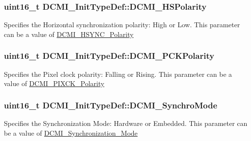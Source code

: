 \subsubsection[{D\+C\+M\+I\+\_\+\+H\+S\+Polarity}]{\setlength{\rightskip}{0pt plus 5cm}uint16\+\_\+t D\+C\+M\+I\+\_\+\+Init\+Type\+Def\+::\+D\+C\+M\+I\+\_\+\+H\+S\+Polarity}\label{struct_d_c_m_i___init_type_def_ab9f87fbe99bdd7f38700379896175512}
Specifies the Horizontal synchronization polarity\+: High or Low. This parameter can be a value of \hyperlink{group___d_c_m_i___h_s_y_n_c___polarity}{D\+C\+M\+I\+\_\+\+H\+S\+Y\+N\+C\+\_\+\+Polarity} \hypertarget{struct_d_c_m_i___init_type_def_a2768de44e7fa6fc7d9caf816cc5121c8}{}
\subsubsection[{D\+C\+M\+I\+\_\+\+P\+C\+K\+Polarity}]{\setlength{\rightskip}{0pt plus 5cm}uint16\+\_\+t D\+C\+M\+I\+\_\+\+Init\+Type\+Def\+::\+D\+C\+M\+I\+\_\+\+P\+C\+K\+Polarity}\label{struct_d_c_m_i___init_type_def_a2768de44e7fa6fc7d9caf816cc5121c8}
Specifies the Pixel clock polarity\+: Falling or Rising. This parameter can be a value of \hyperlink{group___d_c_m_i___p_i_x_c_k___polarity}{D\+C\+M\+I\+\_\+\+P\+I\+X\+C\+K\+\_\+\+Polarity} \hypertarget{struct_d_c_m_i___init_type_def_a92a344a3724664c6c5523474624c66af}{}
\subsubsection[{D\+C\+M\+I\+\_\+\+Synchro\+Mode}]{\setlength{\rightskip}{0pt plus 5cm}uint16\+\_\+t D\+C\+M\+I\+\_\+\+Init\+Type\+Def\+::\+D\+C\+M\+I\+\_\+\+Synchro\+Mode}\label{struct_d_c_m_i___init_type_def_a92a344a3724664c6c5523474624c66af}
Specifies the Synchronization Mode\+: Hardware or Embedded. This parameter can be a value of \hyperlink{group___d_c_m_i___synchronization___mode}{D\+C\+M\+I\+\_\+\+Synchronization\+\_\+\+Mode} \hypertarget{struct_d_c_m_i___init_type_def_aa14287a4d834253e11e0f8682c9596c5}{}
